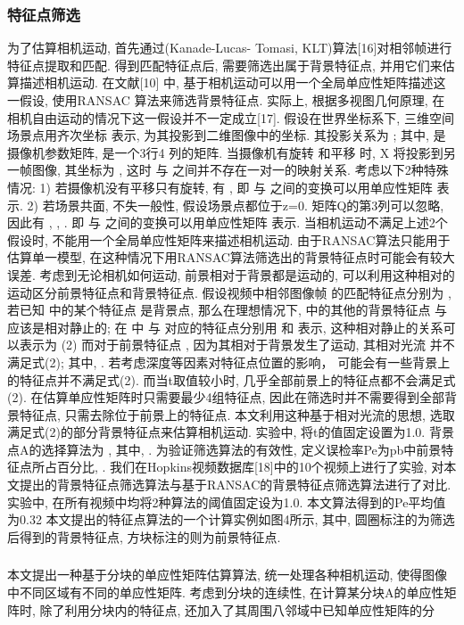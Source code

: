 \subsubsection{特征点筛选}
\label{ch5:sec:sub:sub:fp}
 为了估算相机运动, 首先通过(Kanade-Lucas- Tomasi, KLT)算法[16]对相邻帧进行特征点提取和匹配. 得到匹配特征点后, 需要筛选出属于背景特征点, 并用它们来估算描述相机运动. 在文献[10] 中, 基于相机运动可以用一个全局单应性矩阵描述这一假设, 使用RANSAC 算法来筛选背景特征点. 实际上, 根据多视图几何原理, 在相机自由运动的情况下这一假设并不一定成立[17]. 假设在世界坐标系下, 三维空间场景点用齐次坐标 表示, 为其投影到二维图像中的坐标. 其投影关系为 ; 其中,  是摄像机参数矩阵,  是一个3行4 列的矩阵. 当摄像机有旋转 和平移 时, X 将投影到另一帧图像, 其坐标为 , 这时 与 之间并不存在一对一的映射关系. 考虑以下2种特殊情况:
1) 若摄像机没有平移只有旋转, 有   , 即 与 之间的变换可以用单应性矩阵 表示.
2) 若场景共面, 不失一般性, 假设场景点都位于z=0. 矩阵Q的第3列可以忽略, 因此有
 ,
 ,
 .
即 与 之间的变换可以用单应性矩阵 表示.
当相机运动不满足上述2个假设时, 不能用一个全局单应性矩阵来描述相机运动. 由于RANSAC算法只能用于估算单一模型, 在这种情况下用RANSAC算法筛选出的背景特征点时可能会有较大误差.
考虑到无论相机如何运动, 前景相对于背景都是运动的, 可以利用这种相对的运动区分前景特征点和背景特征点. 假设视频中相邻图像帧 的匹配特征点分别为 , 若已知 中的某个特征点 是背景点, 那么在理想情况下,  中的其他的背景特征点 与 应该是相对静止的; 在 中 与 对应的特征点分别用 和 表示, 这种相对静止的关系可以表示为
	 	(2)
而对于前景特征点 , 因为其相对于背景发生了运动, 其相对光流 并不满足式(2); 其中,  .
若考虑深度等因素对特征点位置的影响， 可能会有一些背景上的特征点并不满足式(2). 而当t取值较小时, 几乎全部前景上的特征点都不会满足式(2). 在估算单应性矩阵时只需要最少4组特征点, 因此在筛选时并不需要得到全部背景特征点, 只需去除位于前景上的特征点. 本文利用这种基于相对光流的思想, 选取满足式(2)的部分背景特征点来估算相机运动. 实验中, 将t的值固定设置为1.0. 背景点A的选择算法为 , 其中,  . 为验证筛选算法的有效性, 定义误检率Pe为pb中前景特征点所占百分比,  .
我们在Hopkins视频数据库[18]中的10个视频上进行了实验, 对本文提出的背景特征点筛选算法与基于RANSAC的背景特征点筛选算法进行了对比. 实验中, 在所有视频中均将2种算法的阈值固定设为1.0. 本文算法得到的Pe平均值为0.32%
本文提出的特征点算法的一个计算实例如图4所示, 其中, 圆圈标注的为筛选后得到的背景特征点, 方块标注的则为前景特征点.

\subsubsection{}
\label{ch5:sec:sub:sub:homography}
本文提出一种基于分块的单应性矩阵估算算法, 统一处理各种相机运动, 使得图像中不同区域有不同的单应性矩阵. 考虑到分块的连续性, 在计算某分块A的单应性矩阵时, 除了利用分块内的特征点, 还加入了其周围八邻域中已知单应性矩阵的分




